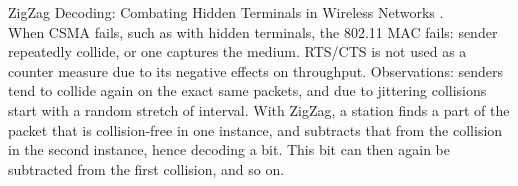 ZigZag Decoding: Combating Hidden Terminals in Wireless Networks \cite{gollakota2008}.\\

When CSMA fails, such as with hidden terminals, the 802.11 MAC fails: sender repeatedly collide, or one captures the medium. RTS/CTS is not used as a counter measure due to its negative effects on throughput. Observations: senders tend to collide again on the exact same packets, and due to jittering collisions start with a random stretch of interval. With ZigZag, a station finds a part of the packet that is collision-free in one instance, and subtracts that from the collision in the second instance, hence decoding a bit. This bit can then again be subtracted from the first collision, and so on.

